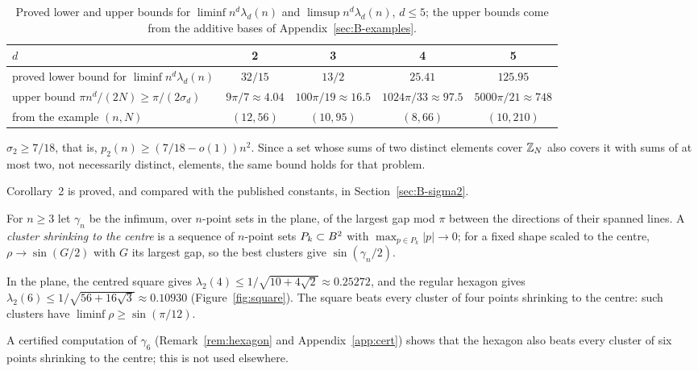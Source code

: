 \documentclass[11pt]{article}
\begin{document}
\begin{table}[ht]
\centering
\caption{Proved lower and upper bounds for $\liminf n^d\lambda_d(n)$ and $\limsup n^d\lambda_d(n)$, $d\le5$; the upper
bounds come from the additive bases of Appendix~\ref{sec:B-examples}.}\label{tab:bounds}
\small
\begin{tabular}{p{4.3cm}cccc}
\toprule
$d$ & 2 & 3 & 4 & 5\\
\midrule
proved lower bound for $\liminf n^d\lambda_d(n)$ & $32/15$ & $13/2$ & $25.41$ & $125.95$\\
upper bound $\pi n^d/(2N)\ge\pi/(2\sigma_d)$ & $9\pi/7\approx4.04$ & $100\pi/19\approx16.5$ &
$1024\pi/33\approx97.5$ & $5000\pi/21\approx748$\\
from the example $(n,N)$ & $(12,56)$ & $(10,95)$ & $(8,66)$ & $(10,210)$\\
\bottomrule
\end{tabular}
\end{table}

\begin{corTwo}
$\sigma_2\ge7/18$, that is, $p_2(n)\ge(7/18-o(1))n^2$. Since a set whose sums of two distinct elements cover
$\mathbb{Z}_N$ also covers it with sums of at most two, not necessarily distinct, elements, the same bound holds for that
problem.
\end{corTwo}
Corollary~2 is proved, and compared with the published constants, in Section~\ref{sec:B-sigma2}.

For $n\ge3$ let $\gamma_n$ be the infimum, over $n$-point sets in the plane, of the largest gap mod $\pi$
between the directions of their spanned lines. A \emph{cluster shrinking to the centre} is a sequence of
$n$-point sets $P_k\subset B^2$ with $\max_{p\in P_k}|p|\to0$; for a fixed shape scaled to the centre, $\rho\to\sin(G/2)$
with $G$ its largest gap, so the best clusters give $\sin(\gamma_n/2)$.

\begin{thmD}
In the plane, the centred square gives $\lambda_2(4)\le 1/\sqrt{10+4\sqrt2}\approx0.25272$, and the
regular hexagon gives $\lambda_2(6)\le1/\sqrt{56+16\sqrt3}\approx0.10930$ (Figure~\ref{fig:square}). The square beats
every cluster of four points shrinking to the centre: such clusters have $\liminf\rho\ge\sin(\pi/12)$.
\end{thmD}

A certified computation of $\gamma_6$ (Remark~\ref{rem:hexagon} and Appendix~\ref{app:cert}) shows that the hexagon also beats
every cluster of six points shrinking to the centre; this is not used elsewhere.
\end{document}
